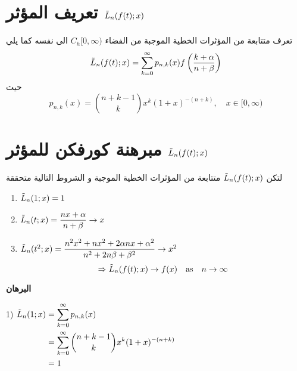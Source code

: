 \section{تعريف المؤثر $\tilde{L}_n(f(t);x)$}
تعرف متتابعة من المؤثرات الخطية الموجبة من الفضاء $C_h[0, \infty)$ الى نفسه كما يلي
\[
\tilde{L}_n(f(t); x) = \sum_{k=0}^{\infty} p_{n, k}(x) f\left(\frac{k+\alpha}{n+\beta}\right)
\]
حيث
\[
p_{n,k} (x) = \binom{n+k-1}{k} x^k (1+x)^{-(n+k)}, \quad x \in [0, \infty)
\]

\section{مبرهنة كورفكن للمؤثر $\tilde{L}_n(f(t); x)$}
لتكن $\tilde{L}_n(f(t);x)$ متتابعة من المؤثرات الخطية الموجبة  و الشروط التالية متحققة
\begin{english}
	\begin{enumerate}[label=\arabic*)]
		\item $\tilde{L}_n(1;x)=1$
		\item $\tilde{L}_n(t;x) = \dfrac{nx + \alpha}{n + \beta} \to x$
		\item $\tilde{L}_n(t^2;x) = \dfrac{n^2x^2 + nx^2 + 2\alpha n x + \alpha^2}{n^2 + 2n\beta+ \beta^2} \to x^2$
		\[
		\Rightarrow\tilde{L}_n(f(t);x) \to f(x) \quad\text{as}\quad n\to \infty
		\]
	\end{enumerate}
\end{english}
\noindent
\textbf{البرهان}

\begin{english}
1) $	\begin{aligned}[t]
		\tilde{L}_n(1; x) &= \sum_{k=0}^{\infty} p_{n,k}(x)\\
		&= \sum_{k=0}^{\infty}\binom{n+k-1}{k} x^k (1+x)^{-(n+k)} \\
		&=1
	\end{aligned}$
\end{english}

